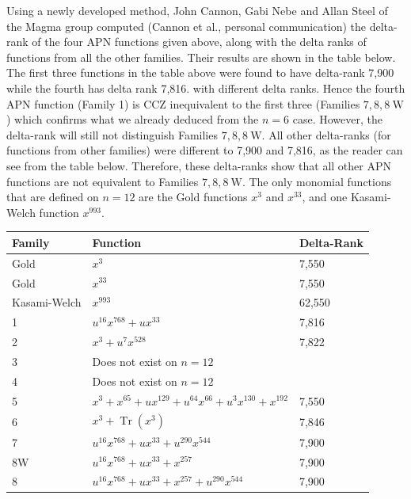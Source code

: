 \documentclass[10pt]{article}
\begin{document}
Using a newly developed method, John Cannon, Gabi Nebe and Allan Steel of the Magma group computed (Cannon et al., personal communication) the delta-rank of the four APN functions given above, along with the delta ranks of functions from all the other families. Their results are shown in the table below. The first three functions in the table above were found to have delta-rank 7,900 while the fourth has delta rank 7,816. with different delta ranks. Hence the fourth APN function (Family 1) is CCZ inequivalent to the first three (Families $7,8,8 \mathrm{~W}$ ) which confirms what we already deduced from the $n=6$ case. However, the delta-rank will still not distinguish Families $7,8,8 \mathrm{~W}$. All other delta-ranks (for functions from other families) were different to 7,900 and 7,816, as the reader can see from the table below. Therefore, these delta-ranks show that all other APN functions are not equivalent to Families $7,8,8 \mathrm{~W}$. The only monomial functions that are defined on $n=12$ are the Gold functions $x^{3}$ and $x^{33}$, and one Kasami-Welch function $x^{993}$.

\begin{center}
\begin{tabular}{|l|l|l|}
\hline
Family & Function & Delta-Rank \\
\hline
Gold & $x^{3}$ & 7,550 \\
\hline
Gold & $x^{33}$ & 7,550 \\
\hline
Kasami-Welch & $x^{993}$ & 62,550 \\
\hline
1 & $u^{16} x^{768}+u x^{33}$ & 7,816 \\
\hline
2 & $x^{3}+u^{7} x^{528}$ & 7,822 \\
\hline
3 & Does not exist on $n=12$ &  \\
\hline
4 & Does not exist on $n=12$ &  \\
\hline
5 & $x^{3}+x^{65}+u x^{129}+u^{64} x^{66}+u^{3} x^{130}+x^{192}$ & 7,550 \\
\hline
6 & $x^{3}+\operatorname{Tr}\left(x^{3}\right)$ & 7,846 \\
\hline
7 & $u^{16} x^{768}+u x^{33}+u^{290} x^{544}$ & 7,900 \\
\hline
8W & $u^{16} x^{768}+u x^{33}+x^{257}$ & 7,900 \\
\hline
8 & $u^{16} x^{768}+u x^{33}+x^{257}+u^{290} x^{544}$ & 7,900 \\
\hline
\end{tabular}
\end{center}
\end{document}

